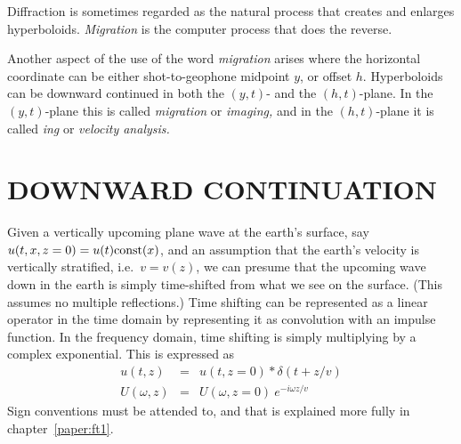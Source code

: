 \par\vspace{1.0\baselineskip}
Diffraction
is sometimes regarded as the natural process that creates
and enlarges hyperboloids.
{\em  Migration}
is the computer process that does the reverse.
\par
Another aspect of the use of the word
{\em  migration}
arises
where the horizontal coordinate can be either shot-to-geophone midpoint  $y$,
or offset  $h$.
Hyperboloids can be downward continued
in both the  $(y , t)$-  and the $(h , t)$-plane.
In the $(y , t)$-plane this is called
{\em  migration}
or 
{\em  imaging,}
and in the  $(h , t)$-plane it is called
{\em  {}ing}
or
{\em 
velocity analysis.
}

\section{DOWNWARD CONTINUATION}
Given a vertically upcoming plane wave
at the earth's surface,
say $u(t,x,z=0)=u(t) {\rm const}(x)$,
and an assumption that the earth's velocity is
vertically stratified, i.e.~$v=v(z)$,
we can presume that the upcoming wave down in the earth
is simply time-shifted from what we see on the surface.
(This assumes no multiple reflections.)
Time shifting can be represented as a linear operator in the time domain
by representing it as convolution with an impulse function.
In the frequency domain, time shifting is simply multiplying
by a complex exponential.
This is expressed as
\begin{eqnarray}
u( t    ,z) &=& u(     t,z=0) \ast \delta( t+z/v) \\
U(\omega,z) &=& U(\omega,z=0) \ e^{-i\omega z/v}
\end{eqnarray}
Sign conventions must be attended to,
and that is explained more fully in chapter~\ref{paper:ft1}.

